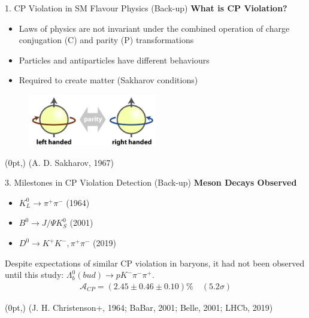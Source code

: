 \documentclass[xcolor=dvipsnames]{beamer}
\def\s{\sigma}
\def\Ld{\Lambda}
\newcommand{\br}[1]{
  \begin{textblock*}{\textwidth}(0pt,\textheight-15pt)
    \raggedleft
    \small{(#1)}
  \end{textblock*}
}
\begin{document}
\begin{frame}{1. CP Violation in SM Flavour Physics (Back-up)}
\textbf{What is CP Violation?}\\
\begin{itemize}
    \item Laws of physics are not invariant under the combined operation of charge conjugation (C) and parity (P) transformations
    \item Particles and antiparticles have different behaviours
    \item Required to create matter (Sakharov conditions)
\end{itemize}
\begin{figure}
    \centering
    \includegraphics[width=0.5\textwidth]{Parity symmetry.png}
\end{figure}
\br{A. D. Sakharov, 1967}
\end{frame}

\begin{frame}{3. Milestones in CP Violation Detection (Back-up)}
\textbf{Meson Decays Observed}\\
\begin{itemize}
    \item $K_{L}^{0}\to \pi^{+}\pi^{-}$ (1964)
    \item $B^0\to J/\Psi K_{S}^{0}$ (2001)
    \item $D^0 \to K^{+}K^{-}, \pi^{+}\pi^{-}$ (2019)
\end{itemize}
\vspace{10pt}
Despite expectations of similar CP violation in baryons, it had not been observed until this study: $\Ld_{b}^{0}(bud)\to p K^{-}\pi^{-}\pi^{+}$.
\begin{align*}
    \mathcal{A}_{CP}=(2.45\pm0.46\pm0.10)\% \quad (5.2\s)
\end{align*}
\br{J. H. Christenson+, 1964; BaBar, 2001; Belle, 2001; LHCb, 2019}
\end{frame}
\end{document}
